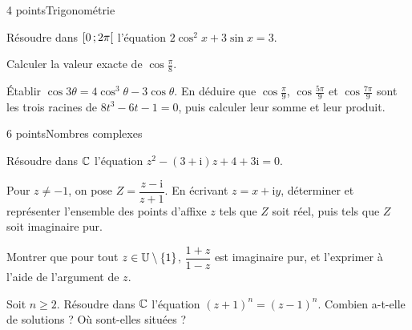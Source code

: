 \begin{exoEval}{4 points}{Trigonométrie}
\begin{questions}
  \item Résoudre dans $\mathopen{[}0\,{;}\,2\pi\mathclose{[}$ l'équation
    $2\cos^{2}x+3\sin x=3$.
  \item Calculer la valeur exacte de $\cos\frac\pi8$.
  \item Établir $\cos3\theta=4\cos^{3}\theta-3\cos\theta$. En déduire que
    $\cos\frac\pi9$, $\cos\frac{5\pi}9$ et $\cos\frac{7\pi}9$ sont les
    trois racines de $8t^{3}-6t-1=0$, puis calculer leur somme et leur
    produit.
\end{questions}
\end{exoEval}

\begin{exoEval}{6 points}{Nombres complexes}
\begin{questions}
  \item Résoudre dans $\mathbb{C}$ l'équation $z^{2}-(3+\mathrm{i})z+4+3\mathrm{i}=0$.
  \item Pour $z\neq-1$, on pose $Z=\dfrac{z-\mathrm{i}}{z+1}$. En écrivant
    $z=x+\mathrm{i}y$, déterminer et représenter l'ensemble des points
    d'affixe $z$ tels que $Z$ soit réel, puis tels que $Z$ soit imaginaire
    pur.
  \item Montrer que pour tout $z\in\mathbb{U}\setminus\left\{1\right\}$,
    $\dfrac{1+z}{1-z}$ est imaginaire pur, et l'exprimer à l'aide de
    l'argument de $z$.
  \item Soit $n\geqslant2$. Résoudre dans $\mathbb{C}$ l'équation
    $(z+1)^{n}=(z-1)^{n}$. Combien a-t-elle de solutions ? Où sont-elles
    situées ?
\end{questions}
\end{exoEval}
